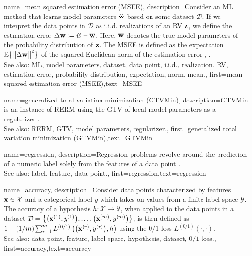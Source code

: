{name={mean squared estimation error (MSEE)},
	description={Consider an ML method that 
		learns model parameters $\widehat{{\bf w}}$ based on some dataset $\mathcal{D}$. 
		If we interpret the data points in $\mathcal{D}$ as i.i.d. realizations of an RV ${\bf z}$, 
		we define the estimation error $\Delta {\bf w} := \widehat{w} - \overline{{\bf w}}$. 
		Here, $\overline{{\bf w}}$ denotes the true model parameters of the probability distribution 
		of ${\bf z}$. The MSEE is 
		defined as the expectation $\mathbb{E}  \big\{ \big\| \Delta {\bf w} \big\|^{2} \big\}$ of the 
		squared Euclidean norm of the estimation error \cite{LC}, \cite{kay}.
					\\ 
		See also: ML, model parameters, dataset, data point, i.i.d., realization, RV, estimation error, probability distribution, expectation, norm, mean.},
	first={mean squared estimation error (MSEE)},text={MSEE} 
}

{name={generalized total variation minimization (GTVMin)},
	description={GTVMin is an instance of RERM 
		using the GTV of local model parameters as a regularizer \cite{ClusteredFLTVMinTSP}.
					\\ 
		See also: RERM, GTV, model parameters, regularizer.},
	first={generalized total variation minimization (GTVMin)},text={GTVMin} 
}

{name={regression},
	description={Regression problems revolve around the 
		prediction of a numeric label solely from the features of a data point \cite[Ch. 2]{MLBasics}.
					\\ 
		See also: label, feature, data point.},
	first={regression},text={regression} 
}

{name={accuracy},
	description={Consider data points characterized by features ${\bf x} \in \mathcal{X}$ and 
		a categorical label $y$ which takes on values from a finite label space $\mathcal{Y}$. The 
		accuracy of a hypothesis $h: \mathcal{X} \rightarrow \mathcal{Y}$, when applied 
		to the data points in a dataset $\mathcal{D} = \big\{ \big({\bf x}^{(1)}, y^{(1)} \big), \ldots, \big({\bf x}^{(m)},y^{(m)}\big) \big\}$, 
		is then defined as $1 - (1/m)\sum_{r=1}^{m} L^{(0/1)}\left(\big({\bf x}^{(r)},y^{(r)}\big),h \right)$ using the $0/1$ loss $L^{(0/1)}\left(\cdot,\cdot \right)$.
					\\ 
		See also: data point, feature, label space, hypothesis, dataset, $0/1$ loss.},
	first={accuracy},text={accuracy} 
}





